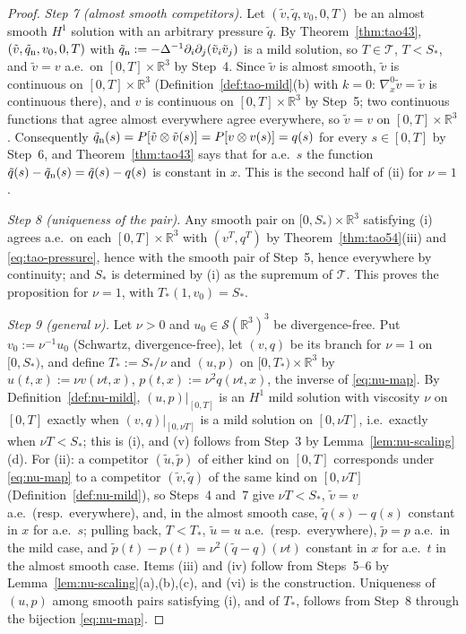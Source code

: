 \documentclass[11pt]{article}
\theoremstyle{definition}
\theoremstyle{plain}
\newcommand{\R}{\mathbb R}
\begin{document}
\begin{proof}
\emph{Step 7 (almost smooth competitors).}  Let $(\tilde v,\tilde q,
v_0,0,T)$ be an almost smooth $H^1$ solution with an arbitrary pressure
$\tilde q$.  By Theorem~\ref{thm:tao43}, $(\tilde v,\tilde q_{\rm n},
v_0,0,T)$ with $\tilde q_{\rm n}:=-\Delta^{-1}\partial_i\partial_j
(\tilde v_i\tilde v_j)$ is a mild solution, so $T\in\mathcal T$, $T<S_*$,
and $\tilde v=v$ a.e.\ on $[0,T]\times\R^3$ by Step~4.  Since $\tilde v$
is almost smooth, $\tilde v$ is continuous on $[0,T]\times\R^3$
(Definition~\ref{def:tao-mild}(b) with $k=0$: $\nabla_x^0\tilde v=\tilde v$
is continuous there), and $v$ is continuous on $[0,T]\times\R^3$ by
Step~5; two continuous functions that agree almost everywhere agree
everywhere, so $\tilde v=v$ on $[0,T]\times\R^3$.  Consequently
$\tilde q_{\rm n}(s)=P[\tilde v\otimes\tilde v(s)]=P[v\otimes v(s)]=q(s)$
for every $s\in[0,T]$ by Step~6, and Theorem~\ref{thm:tao43} says that for
a.e.\ $s$ the function $\tilde q(s)-\tilde q_{\rm n}(s)=\tilde q(s)-q(s)$
is constant in $x$.  This is the second half of (ii) for $\nu=1$.

\emph{Step 8 (uniqueness of the pair).}  Any smooth pair on
$[0,S_*)\times\R^3$ satisfying (i) agrees a.e.\ on each $[0,T]\times\R^3$
with $(v^T,q^T)$ by Theorem~\ref{thm:tao54}(iii) and
\eqref{eq:tao-pressure}, hence with the smooth pair of Step~5, hence
everywhere by continuity; and $S_*$ is determined by (i) as the supremum
of $\mathcal T$.  This proves the proposition for $\nu=1$, with
$T_*(1,v_0)=S_*$.

\emph{Step 9 (general $\nu$).}  Let $\nu>0$ and $u_0\in\mathcal S(\R^3)^3$
be divergence-free.  Put $v_0:=\nu^{-1}u_0$ (Schwartz, divergence-free),
let $(v,q)$ be its branch for $\nu=1$ on $[0,S_*)$, and define
$T_*:=S_*/\nu$ and $(u,p)$ on $[0,T_*)\times\R^3$ by $u(t,x):=\nu v(\nu
t,x)$, $p(t,x):=\nu^2q(\nu t,x)$, the inverse of \eqref{eq:nu-map}.  By
Definition~\ref{def:nu-mild}, $(u,p)|_{[0,T]}$ is an $H^1$ mild solution
with viscosity $\nu$ on $[0,T]$ exactly when $(v,q)|_{[0,\nu T]}$ is a
mild solution on $[0,\nu T]$, i.e.\ exactly when $\nu T<S_*$; this is (i),
and (v) follows from Step~3 by Lemma~\ref{lem:nu-scaling}(d).  For (ii):
a competitor $(\tilde u,\tilde p)$ of either kind on $[0,T]$ corresponds
under \eqref{eq:nu-map} to a competitor $(\tilde v,\tilde q)$ of the same
kind on $[0,\nu T]$ (Definition~\ref{def:nu-mild}), so Steps~4 and~7 give
$\nu T<S_*$, $\tilde v=v$ a.e.\ (resp.\ everywhere), and, in the almost
smooth case, $\tilde q(s)-q(s)$ constant in $x$ for a.e.\ $s$; pulling
back, $T<T_*$, $\tilde u=u$ a.e.\ (resp.\ everywhere), $\tilde p=p$ a.e.\
in the mild case, and $\tilde p(t)-p(t)=\nu^2(\tilde q-q)(\nu t)$ constant
in $x$ for a.e.\ $t$ in the almost smooth case.  Items (iii) and (iv)
follow from Steps~5--6 by Lemma~\ref{lem:nu-scaling}(a),(b),(c), and (vi)
is the construction.  Uniqueness of $(u,p)$ among smooth pairs satisfying
(i), and of $T_*$, follows from Step~8 through the bijection
\eqref{eq:nu-map}.
\end{proof}
\end{document}
